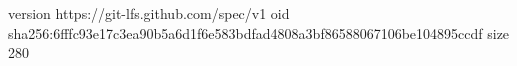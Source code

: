 version https://git-lfs.github.com/spec/v1
oid sha256:6fffc93e17c3ea90b5a6d1f6e583bdfad4808a3bf86588067106be104895ccdf
size 280
